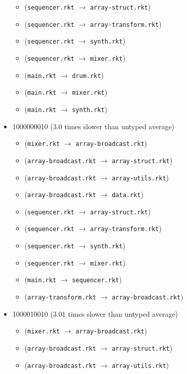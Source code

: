 \documentclass{article}
\newcommand{\mono}[1]{\texttt{#1}}
\begin{document}
\begin{itemize}
  \begin{itemize}
  \item (\mono{sequencer.rkt} $\rightarrow$ \mono{array-struct.rkt})
  \item (\mono{sequencer.rkt} $\rightarrow$ \mono{array-transform.rkt})
  \item (\mono{sequencer.rkt} $\rightarrow$ \mono{synth.rkt})
  \item (\mono{sequencer.rkt} $\rightarrow$ \mono{mixer.rkt})
  \item (\mono{main.rkt} $\rightarrow$ \mono{drum.rkt})
  \item (\mono{main.rkt} $\rightarrow$ \mono{mixer.rkt})
  \item (\mono{main.rkt} $\rightarrow$ \mono{synth.rkt})
  \end{itemize}
\item 1000000010 (3.0 times slower than untyped average)
  \begin{itemize}
  \item (\mono{mixer.rkt} $\rightarrow$ \mono{array-broadcast.rkt})
  \item (\mono{array-broadcast.rkt} $\rightarrow$ \mono{array-struct.rkt})
  \item (\mono{array-broadcast.rkt} $\rightarrow$ \mono{array-utils.rkt})
  \item (\mono{array-broadcast.rkt} $\rightarrow$ \mono{data.rkt})
  \item (\mono{sequencer.rkt} $\rightarrow$ \mono{array-struct.rkt})
  \item (\mono{sequencer.rkt} $\rightarrow$ \mono{array-transform.rkt})
  \item (\mono{sequencer.rkt} $\rightarrow$ \mono{synth.rkt})
  \item (\mono{sequencer.rkt} $\rightarrow$ \mono{mixer.rkt})
  \item (\mono{main.rkt} $\rightarrow$ \mono{sequencer.rkt})
  \item (\mono{array-transform.rkt} $\rightarrow$ \mono{array-broadcast.rkt})
  \end{itemize}
\item 1000010010 (3.01 times slower than untyped average)
  \begin{itemize}
  \item (\mono{mixer.rkt} $\rightarrow$ \mono{array-broadcast.rkt})
  \item (\mono{array-broadcast.rkt} $\rightarrow$ \mono{array-struct.rkt})
  \item (\mono{array-broadcast.rkt} $\rightarrow$ \mono{array-utils.rkt})

\end{itemize}
\end{itemize}
\end{document}
